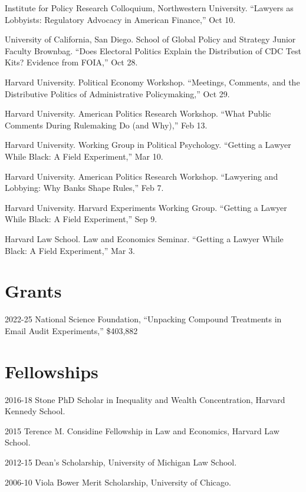 \documentclass[12pt,letterpaper]{report}
\newcommand{\talk}[4]{\item[#1]{\tab{}#3. \enquote{#2,} #4.}} %
\begin{document}
    \begin{tablist}
	\talk{2022}{Lawyers as Lobbyists: Regulatory Advocacy in American Finance}{Institute for Policy Research Colloquium, Northwestern University}{Oct 10}
    \talk{2020}{Does Electoral Politics Explain the Distribution of CDC Test Kits? Evidence from FOIA}{ University of California, San Diego. School of Global Policy and Strategy Junior Faculty Brownbag}{Oct 28}
    \talk{2018}{Meetings, Comments, and the Distributive Politics of Administrative Policymaking}{Harvard University. Political Economy Workshop}{Oct 29}
	\talk{2018}{What Public Comments During Rulemaking Do (and Why)}{Harvard University. American Politics Research Workshop}{Feb 13}
    \talk{2017}{Getting a Lawyer While Black: A Field Experiment}{Harvard University. Working Group in Political Psychology}{Mar 10}
    \talk{2017}{Lawyering and Lobbying: Why Banks Shape Rules}{Harvard University. American Politics Research Workshop}{Feb 7}
    \talk{2016}{Getting a Lawyer While Black: A Field Experiment}{Harvard University. Harvard Experiments Working Group}{Sep 9}
    \talk{2016}{Getting a Lawyer While Black: A Field Experiment}{Harvard Law School. Law and Economics Seminar}{Mar 3}
    \end{tablist}
	
    \section*{Grants}
	\begin{tablist}
	\item[2022-25]	\tab{}National Science Foundation, ``Unpacking Compound Treatments in Email Audit Experiments,'' \$403,882
	\end{tablist}
    
    \section*{Fellowships}
    
    \begin{tablist}
    \item[2016-18] \tab{}Stone PhD Scholar in Inequality and Wealth Concentration, Harvard Kennedy School.
    \item[2015] \tab{}Terence M. Considine Fellowship in Law and Economics, Harvard Law School.
    \item[2012-15] \tab{}Dean's Scholarship, University of Michigan Law School.
    \item[2006-10] \tab{}Viola Bower Merit Scholarship, University of Chicago.
    \end{tablist}
\end{document}
